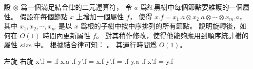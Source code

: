 \startEXERCISE
設 $\otimes$ 爲一個滿足結合律的二元運算符，
令 $a$ 爲紅黑樹中每個節點要維護的一個屬性。
假設在每個節點 $x$ 上增加一個屬性 $f$，
使得 $x.f=x_1.a \otimes x_2.a \otimes \cdots \otimes x_m.a$，
其中 $x_1,x_2,\cdots,x_m$ 是以 $x$ 爲根的子樹中按中序排列的所有節點。
說明旋轉後，如何在 $O(1)$ 時間內更新屬性 $f$。
對其稍作修改，使得他能夠應用到順序統計樹的屬性 $size$ 中。
\stopEXERCISE
\startANSWER
根據結合律可知： 。
其運行時間爲 $O(1)$。

\externalfigure[e13_2_3-1]

\bTABLE[align=center]
\bTABLEhead\bTR
	\bTH 左旋 \eTH
	\bTH 右旋 \eTH
\eTR\eTABLEhead
\bTABLEbody\bTR
	\bTD \startformula\startmathalignment
\NC x'.f \NC = \alpha.f \otimes x.a \otimes \beta.f \NR
\NC y'.f \NC = x.f \NR
\stopmathalignment\stopformula \eTD
	\bTD \startformula\startmathalignment
\NC y'.f \NC = \beta.f \otimes y.a \otimes \gamma.f \NR
\NC x'.f \NC = y.f \NR
\stopmathalignment\stopformula \eTD
\eTR\eTABLEbody
\eTABLE

\stopANSWER

